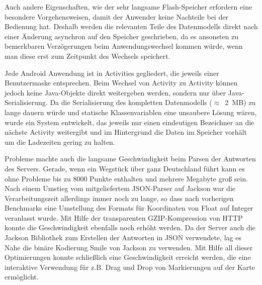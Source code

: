 Auch andere Eigenschaften, wie der sehr langsame Flash-Speicher erfordern eine besondere Vorgehensweisen, damit der Anwender keine Nachteile bei der Bedienung hat. Deshalb werden die relevanten Teile des Datenmodells direkt nach einer Änderung asynchron auf den Speicher geschrieben, da es ansonsten zu bemerkbaren Verzögerungen beim Anwendungswechsel kommen würde, wenn man diese erst zum Zeitpunkt des Wechsels speichert.

Jede Android Anwendung ist in Activities gegliedert, die jeweils einer Benutzermaske entsprechen. Beim Wechsel von Activity zu Activity können jedoch keine Java-Objekte direkt weitergeben werden, sondern nur über Java-Serialisierung. Da die Serialisierung des kompletten Datenmodells ($\approx$~2~MB) zu lange dauern würde und statische Klassenvariablen eine unsaubere Lösung wären, wurde ein System entwickelt, das jeweils nur einen eindeutigen Bezeichner an die nächste Activity weitergibt und im Hintergrund die Daten im Speicher vorhält um die Ladezeiten gering zu halten.

Probleme machte auch die langsame Geschwindigkeit beim Parsen der Antworten des Servers. Gerade, wenn ein Wegstück über ganz Deutschland führt kann es ohne Probleme bis zu 8000 Punkte enthalten und mehrere Megabyte groß sein. Nach einem Umstieg vom mitgeliefertem JSON-Parser auf Jackson war die Verarbeitungszeit allerdings immer noch zu lange, so dass nach vorherigen Benchmarks eine Umstellung des Formats für Koordinaten von Float auf Integer veranlasst wurde. Mit Hilfe der transparenten GZIP-Kompression von HTTP konnte die Geschwindigkeit ebenfalls noch erhöht werden. Da der Server auch die Jackson Bibliothek zum Erstellen der Antworten in JSON verwendete, lag es Nahe die binäre Kodierung Smile von Jackson zu verwenden. Mit Hilfe all dieser Optimierungen konnte schließlich eine Geschwindigkeit erreicht werden, die eine interaktive Verwendung für z.B. Drag und Drop von Markierungen auf der Karte ermöglicht.